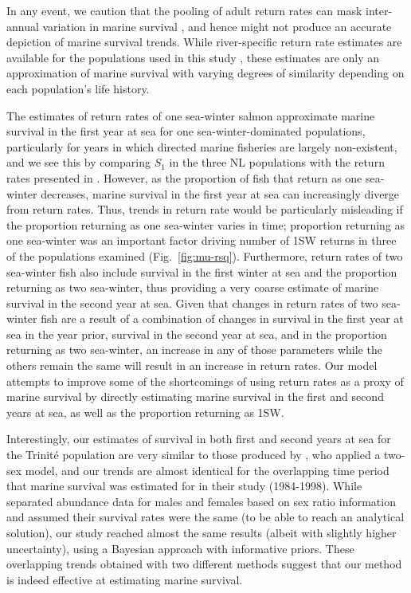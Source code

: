 \documentclass[12pt]{article}
\begin{document}
In any event, we caution that the pooling of adult return rates
\citep{Chaput2012a, Friedland1993,Gibson2016} can mask inter-annual
variation in marine survival \citep{Hubley2011}, and hence might not produce
an accurate depiction of marine survival trends.
While river-specific return rate estimates are available for the populations
used in this study \citep{ICES2019}, these estimates are only an approximation
of marine survival with varying degrees of similarity depending on each
population's life history. 

The estimates of return rates of one sea-winter salmon
approximate marine survival in the first year at sea for one
sea-winter-dominated populations, particularly for years in which 
directed marine fisheries are largely non-existent,
and we see this by comparing $S_1$ in the three NL populations
with the return rates presented in \citet{ICES2019}. However, as the proportion of fish that
return as one sea-winter decreases, marine survival in the first year at sea
can increasingly diverge from return rates. Thus, trends in return rate
would be particularly misleading if the proportion returning as one sea-winter
varies in time;
proportion returning as one sea-winter was an important factor driving number of 
1SW returns in three of the populations examined (Fig.~\ref{fig:mu-rsq}).
Furthermore, return rates of two sea-winter fish also include survival in the
first winter at sea and the proportion returning as two sea-winter, thus
providing a very coarse estimate of marine survival in the second year at sea. 
Given that changes in return rates of two sea-winter fish are a result of a
combination of changes in survival in the first year at sea in the year prior,
survival in the second year at sea, and in the proportion returning as two
sea-winter, an increase in any of those parameters while the others remain
the same will result in an increase in return rates. Our model attempts to
improve some of the shortcomings of using return rates as a proxy of marine
survival by directly estimating marine survival in the first and second years
at sea, as well as the proportion returning as 1SW.

Interestingly, our estimates of survival in both first and second years at sea
for the Trinit\'{e} population are very similar to those produced by
\citet{Chaput2003b}, who applied a two-sex model, and our trends are almost identical
for the overlapping time period that marine survival was estimated for in
their study (1984-1998). While \citet{Chaput2003b} separated abundance data
for males and females based on sex ratio information and assumed their
survival rates were the same (to be able to reach an analytical solution), our
study reached almost the same results (albeit with slightly higher
uncertainty), using a Bayesian approach with informative priors. These
overlapping trends obtained with two different methods suggest that our method
is indeed effective at estimating marine survival.
\end{document}
